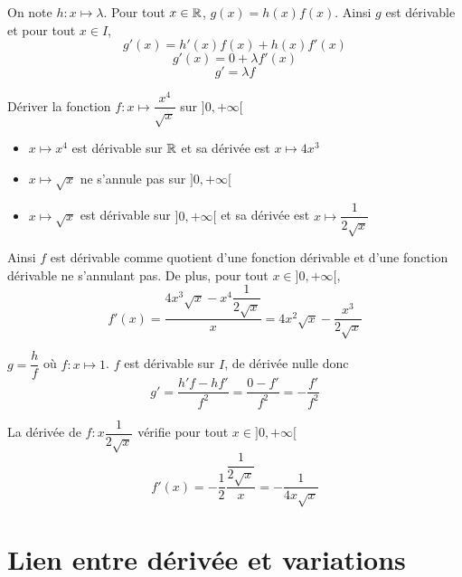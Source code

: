 \begin{preuve}
On note $h:x\mapsto \lambda$. Pour tout $x\in\mathbb{R}$, $g(x) = h(x)f(x)$. Ainsi $g$ est dérivable et pour tout $x\in I$, 
$$g'(x) = h'(x)f(x) + h(x)f'(x)$$
$$g'(x) = 0 + \lambda f'(x)$$
$$g' = \lambda f$$
\end{preuve}

\begin{exemple}
Dériver la fonction $f:x\mapsto \dfrac{x^4}{\sqrt{x}}$ sur $]0,+\infty[$\newline

\begin{itemize}
\item $x\mapsto x^4$ est dérivable sur $\mathbb{R}$ et sa dérivée est $x\mapsto 4x^3$
\item $x\mapsto \sqrt{x}$ ne s'annule pas sur $]0,+\infty[$
\item $x\mapsto \sqrt{x}$ est dérivable sur $]0,+\infty[$ et sa dérivée est $x\mapsto \dfrac{1}{2\sqrt{x}}$
\end{itemize}
Ainsi $f$ est dérivable comme quotient d'une fonction dérivable et d'une fonction dérivable ne s'annulant pas. De plus, pour tout $x\in ]0,+\infty[$,
$$f'(x) = \dfrac{4x^3\sqrt{x} - x^4\dfrac{1}{2\sqrt{x}}}{x} = 4x^2\sqrt{x} - \dfrac{x^3}{2\sqrt{x}}$$
\end{exemple}

\newline

\begin{preuve}
$g = \dfrac{h}{f}$ où $f:x\mapsto 1$. $f$ est dérivable sur $I$, de dérivée nulle donc
$$g' = \dfrac{h'f - hf'}{f^2} = \dfrac{0 - f'}{f^2} = -\dfrac{f'}{f^2}$$
\end{preuve}
\begin{exemple}
La dérivée de $f:x\dfrac{1}{2\sqrt{x}}$ vérifie pour tout $x\in ]0,+\infty[$
$$f'(x) = -\dfrac{1}{2} \dfrac{\dfrac{1}{2\sqrt{x}}}{x} = -\dfrac{1}{4x\sqrt{x}}$$
\end{exemple}
\section{Lien entre dérivée et variations}
